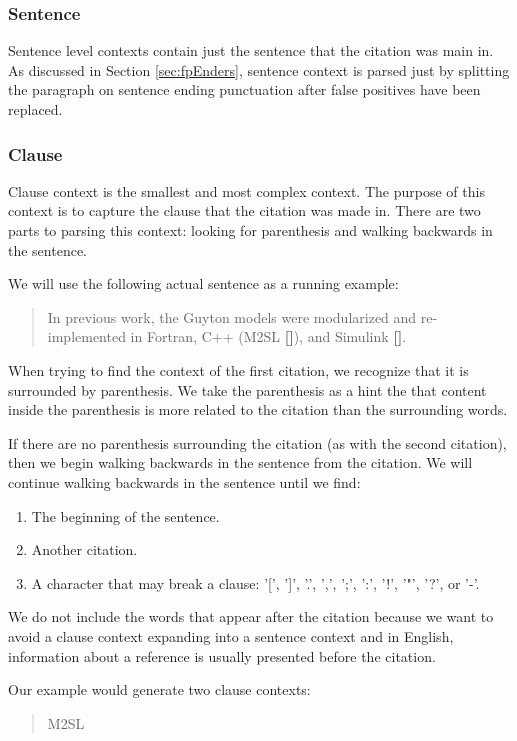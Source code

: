 \documentclass[10pt, conference, compsocconf]{IEEEtran}
\begin{document}
\subsubsection{Sentence}
Sentence level contexts contain just the sentence that the citation was main in. As discussed in Section \ref{sec:fpEnders},
sentence context is parsed just by splitting the paragraph on sentence ending punctuation after false positives have been replaced.

\subsubsection{Clause}
Clause context is the smallest and most complex context. The purpose of this context is to capture the clause that the citation was made in.
There are two parts to parsing this context: looking for parenthesis and walking backwards in the sentence.

We will use the following actual sentence as a running example:
\begin{quote}
In previous work, the Guyton models were modularized and re-implemented in Fortran, C++ (M2SL \textbf{[]}), and Simulink \textbf{[]}.
\end{quote}

When trying to find the context of the first citation, we recognize that it is surrounded by parenthesis.
We take the parenthesis as a hint the that content inside the parenthesis is more related to the citation than the surrounding words.

If there are no parenthesis surrounding the citation (as with the second citation), then we begin walking backwards in the sentence from the citation.
We will continue walking backwards in the sentence until we find:
\begin{enumerate}
   \item The beginning of the sentence.
   \item Another citation.
   \item A character that may break a clause: '[', ']', '.', ',', ';', ':', '!', '"', '?', or '-'.
\end{enumerate}

We do not include the words that appear after the citation because we want to avoid a clause context expanding into a sentence context and
in English, information about a reference is usually presented before the citation.

Our example would generate two clause contexts:
\begin{quote}
M2SL
\end{quote}
\end{document}
